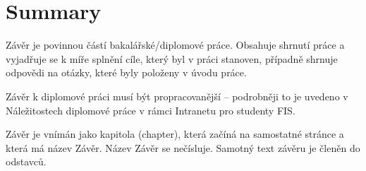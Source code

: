 \chapter*{Summary}

Závěr je povinnou částí bakalářské/diplomové práce. Obsahuje shrnutí práce a vyjadřuje se k míře splnění cíle, který byl v práci stanoven, případně shrnuje odpovědi na otázky, které byly položeny v úvodu práce. 

Závěr k diplomové práci musí být propracovanější -- podrobněji to je uvedeno v Náležitostech diplomové práce v rámci Intranetu pro studenty FIS.

Závěr je vnímán jako kapitola (chapter), která začíná na samostatné stránce a která má název Závěr.  Název Závěr se nečísluje. Samotný text závěru je členěn do odstavců.